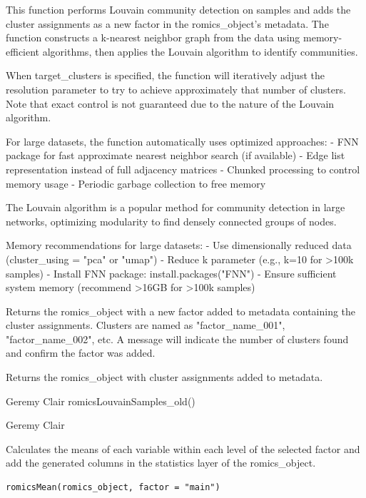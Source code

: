 \documentclass[a4paper]{book}
\begin{document}
\begin{Details}
This function performs Louvain community detection on samples and adds the cluster assignments
as a new factor in the romics\_object's metadata. The function constructs a k-nearest neighbor
graph from the data using memory-efficient algorithms, then applies the Louvain algorithm to identify communities.

When target\_clusters is specified, the function will iteratively adjust the resolution parameter
to try to achieve approximately that number of clusters. Note that exact control is not guaranteed
due to the nature of the Louvain algorithm.

For large datasets, the function automatically uses optimized approaches:
- FNN package for fast approximate nearest neighbor search (if available)
- Edge list representation instead of full adjacency matrices
- Chunked processing to control memory usage
- Periodic garbage collection to free memory

The Louvain algorithm is a popular method for community detection in large networks,
optimizing modularity to find densely connected groups of nodes.

Memory recommendations for large datasets:
- Use dimensionally reduced data (cluster\_using = "pca" or "umap")
- Reduce k parameter (e.g., k=10 for >100k samples)
- Install FNN package: install.packages("FNN")
- Ensure sufficient system memory (recommend >16GB for >100k samples)
\end{Details}
%
\begin{Value}
Returns the romics\_object with a new factor added to metadata containing the cluster assignments.
Clusters are named as "factor\_name\_001", "factor\_name\_002", etc.
A message will indicate the number of clusters found and confirm the factor was added.

Returns the romics\_object with cluster assignments added to metadata.
\end{Value}
%
\begin{Author}
Geremy Clair
romicsLouvainSamples\_old()

Geremy Clair
\end{Author}
%
\begin{Description}
Calculates the means of each variable within each level of the selected factor and add the generated columns in the statistics layer of the romics\_object.
\end{Description}
%
\begin{Usage}
\begin{verbatim}
romicsMean(romics_object, factor = "main")
\end{verbatim}
\end{Usage}
\end{document}
